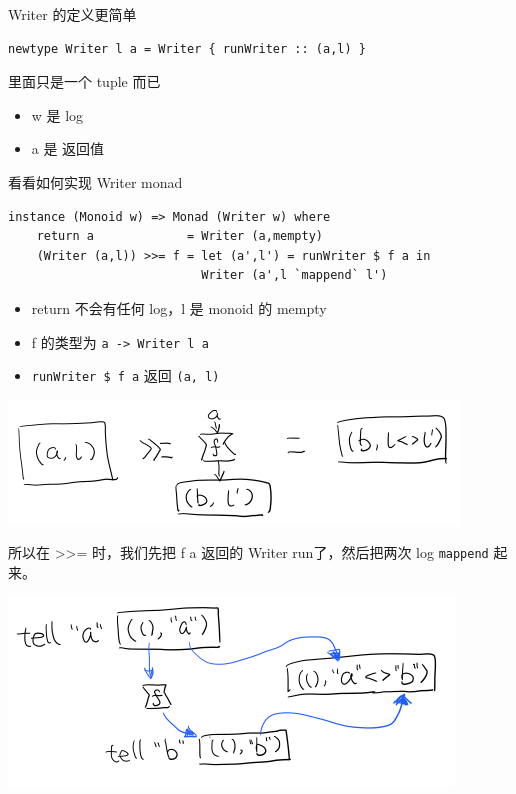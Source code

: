 \documentclass[11pt]{tufte-book}
\begin{document}
Writer 的定义更简单
\begin{verbatim}
newtype Writer l a = Writer { runWriter :: (a,l) }
\end{verbatim}
里面只是一个 tuple 而已
\begin{itemize}
\item w 是 log
\item a 是 返回值
\end{itemize}

看看如何实现 Writer monad
\begin{verbatim}
instance (Monoid w) => Monad (Writer w) where
    return a             = Writer (a,mempty)
    (Writer (a,l)) >>= f = let (a',l') = runWriter $ f a in
                           Writer (a',l `mappend` l')
\end{verbatim}

\begin{itemize}
\item return 不会有任何 log，l 是 monoid 的 mempty
\item f 的类型为 \texttt{a -> Writer l a}
\item \texttt{runWriter \$ f a} 返回 \texttt{(a, l)}
\end{itemize}

\begin{center}
\includegraphics[width=.9\linewidth]{images/p2-writer-monad.png}
\end{center}

所以在 >>= 时，我们先把 f a 返回的 Writer run了，然后把两次 log \texttt{mappend} 起来。
\begin{center}
\includegraphics[width=.9\linewidth]{images/p2-writer-monad-bind.png}
\end{center}
\end{document}
